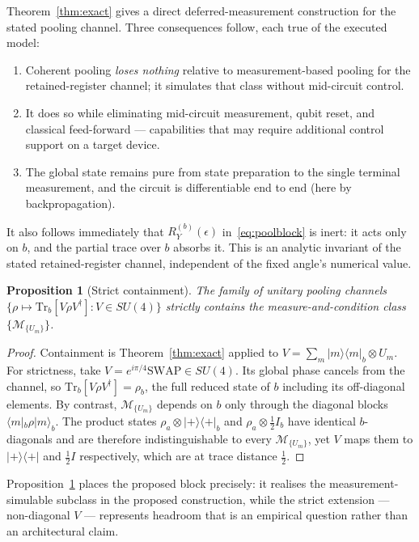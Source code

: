 \documentclass[conference]{IEEEtran}
\newtheorem{proposition}{Proposition}
\begin{document}
Theorem~\ref{thm:exact} gives a direct deferred-measurement construction for the stated pooling channel. Three consequences follow, each true of the executed model:
\begin{enumerate}
\item Coherent pooling \emph{loses nothing} relative to measurement-based pooling for the retained-register channel; it simulates that class without mid-circuit control.
\item It does so while eliminating mid-circuit measurement, qubit reset, and classical feed-forward --- capabilities that may require additional control support on a target device. 
\item The global state remains pure from state preparation to the single terminal measurement, and the circuit is differentiable end to end (here by backpropagation).
\end{enumerate}

It also follows immediately that $R_Y^{(b)}(\epsilon)$ in~\eqref{eq:poolblock} is inert: it acts only on $b$, and the partial trace over $b$ absorbs it. This is an analytic invariant of the stated retained-register channel, independent of the fixed angle's numerical value.

\begin{proposition}[Strict containment]
\label{prop:containment}
The family of unitary pooling channels $\{\rho \mapsto \mathrm{Tr}_b[V \rho V^{\dagger}] : V \in SU(4)\}$ \emph{strictly} contains the measure-and-condition class $\{\mathcal{M}_{\{U_m\}}\}$.
\end{proposition}

\begin{proof}
Containment is Theorem~\ref{thm:exact} applied to $V = \sum_m |m\rangle\langle m|_b \otimes U_m$. For strictness, take $V = e^{i\pi/4}\mathrm{SWAP} \in SU(4)$. Its global phase cancels from the channel, so $\mathrm{Tr}_b[V \rho V^{\dagger}] = \rho_b$, the full reduced state of $b$ including its off-diagonal elements. By contrast, $\mathcal{M}_{\{U_m\}}$ depends on $b$ only through the diagonal blocks $\langle m|_b \rho |m\rangle_b$. The product states $\rho_a \otimes |{+}\rangle\langle{+}|_b$ and $\rho_a \otimes \tfrac{1}{2}I_b$ have identical $b$-diagonals and are therefore indistinguishable to every $\mathcal{M}_{\{U_m\}}$, yet $V$ maps them to $|{+}\rangle\langle{+}|$ and $\tfrac{1}{2}I$ respectively, which are at trace distance $\tfrac{1}{2}$.
\end{proof}

Proposition~\ref{prop:containment} places the proposed block precisely: it realises the measurement-simulable subclass in the proposed construction, while the strict extension --- non-diagonal $V$ --- represents headroom that is an empirical question rather than an architectural claim.
\end{document}
